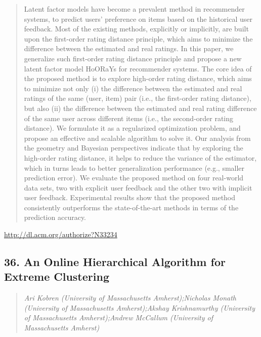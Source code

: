\documentclass{article}
\begin{document}
\begin{quote}
Latent factor models have become a prevalent method in recommender systems, to predict users’ preference on items based on the historical user feedback. Most of the existing methods, explicitly or implicitly, are built upon the first-order rating distance principle, which aims to minimize the difference between the estimated and real ratings. In this paper, we generalize such first-order rating distance principle and propose a new latent factor model HoORaYs for recommender systems. The core idea of the proposed method is to explore high-order rating distance, which aims to minimize not only (i) the difference between the estimated and real ratings of the same (user, item) pair (i.e., the first-order rating distance), but also (ii) the difference between the estimated and real rating difference of the same user across different items (i.e., the second-order rating distance). We formulate it as a regularized optimization problem, and propose an effective and scalable algorithm to solve it. Our analysis from the geometry and Bayesian perspectives indicate that by exploring the high-order rating distance, it helps to reduce the variance of the estimator, which in turns leads to better generalization performance (e.g., smaller prediction error). We evaluate the proposed method on four real-world data sets, two with explicit user feedback and the other two with implicit user feedback. Experimental results show that the proposed method consistently outperforms the state-of-the-art methods in terms of the prediction accuracy.
\end{quote}

\href{http://dl.acm.org/authorize?N33234}{http://dl.acm.org/authorize?N33234}

\subsection{36. An Online Hierarchical Algorithm for Extreme Clustering}

\begin{quote}
\footnotesize{\textit{Ari Kobren (University of Massachusetts Amherst);Nicholas Monath (University of Massachusetts Amherst);Akshay Krishnamurthy (University of Massachusetts Amherst);Andrew McCallum (University of Massachusetts Amherst)}}

\end{quote}
\end{document}
